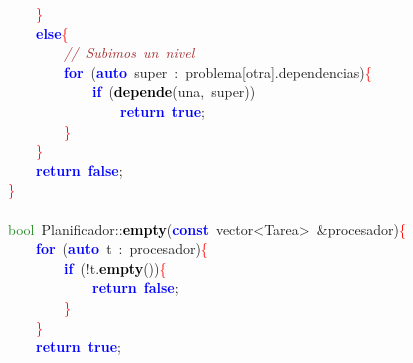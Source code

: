 \mbox{}\ \ \ \ \textcolor{Red}{\}} \\
\mbox{}\ \ \ \ \textbf{\textcolor{Blue}{else}}\textcolor{Red}{\{} \\
\mbox{}\ \ \ \ \ \ \ \ \textit{\textcolor{Brown}{//\ Subimos\ un\ nivel}} \\
\mbox{}\ \ \ \ \ \ \ \ \textbf{\textcolor{Blue}{for}}\ \textcolor{BrickRed}{(}\textbf{\textcolor{Blue}{auto}}\ super\ \textcolor{BrickRed}{:}\ problema\textcolor{BrickRed}{[}otra\textcolor{BrickRed}{].}dependencias\textcolor{BrickRed}{)}\textcolor{Red}{\{} \\
\mbox{}\ \ \ \ \ \ \ \ \ \ \ \ \textbf{\textcolor{Blue}{if}}\ \textcolor{BrickRed}{(}\textbf{\textcolor{Black}{depende}}\textcolor{BrickRed}{(}una\textcolor{BrickRed}{,}\ super\textcolor{BrickRed}{))} \\
\mbox{}\ \ \ \ \ \ \ \ \ \ \ \ \ \ \ \ \textbf{\textcolor{Blue}{return}}\ \textbf{\textcolor{Blue}{true}}\textcolor{BrickRed}{;} \\
\mbox{}\ \ \ \ \ \ \ \ \textcolor{Red}{\}} \\
\mbox{}\ \ \ \ \textcolor{Red}{\}} \\
\mbox{}\ \ \ \ \textbf{\textcolor{Blue}{return}}\ \textbf{\textcolor{Blue}{false}}\textcolor{BrickRed}{;} \\
\mbox{}\textcolor{Red}{\}} \\
\mbox{} \\
\mbox{}\textcolor{ForestGreen}{bool}\ Planificador\textcolor{BrickRed}{::}\textbf{\textcolor{Black}{empty}}\textcolor{BrickRed}{(}\textbf{\textcolor{Blue}{const}}\ \textcolor{TealBlue}{vector\textless{}Tarea\textgreater{}}\ \textcolor{BrickRed}{\&}procesador\textcolor{BrickRed}{)}\textcolor{Red}{\{} \\
\mbox{}\ \ \ \ \textbf{\textcolor{Blue}{for}}\ \textcolor{BrickRed}{(}\textbf{\textcolor{Blue}{auto}}\ t\ \textcolor{BrickRed}{:}\ procesador\textcolor{BrickRed}{)}\textcolor{Red}{\{} \\
\mbox{}\ \ \ \ \ \ \ \ \textbf{\textcolor{Blue}{if}}\ \textcolor{BrickRed}{(!}t\textcolor{BrickRed}{.}\textbf{\textcolor{Black}{empty}}\textcolor{BrickRed}{())}\textcolor{Red}{\{} \\
\mbox{}\ \ \ \ \ \ \ \ \ \ \ \ \textbf{\textcolor{Blue}{return}}\ \textbf{\textcolor{Blue}{false}}\textcolor{BrickRed}{;} \\
\mbox{}\ \ \ \ \ \ \ \ \textcolor{Red}{\}} \\
\mbox{}\ \ \ \ \textcolor{Red}{\}} \\
\mbox{}\ \ \ \ \textbf{\textcolor{Blue}{return}}\ \textbf{\textcolor{Blue}{true}}\textcolor{BrickRed}{;} \\

